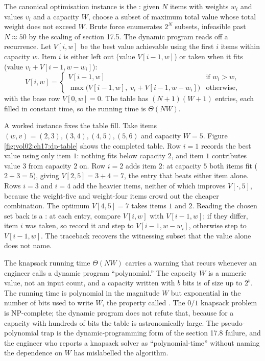 The canonical optimisation instance is the : given $N$ items with weights $w_{i}$ and values $v_{i}$
and a capacity $W$, choose a subset of maximum total value whose
total weight does not exceed $W$. Brute force enumerates $2^{N}$
subsets, infeasible past $N \approx 50$ by the scaling of section
17.5. The dynamic program reads off a recurrence. Let $V[i, w]$ be
the best value achievable using the first $i$ items within capacity
$w$. Item $i$ is either left out (value $V[i-1, w]$) or taken when
it fits (value $v_{i} + V[i-1, w - w_{i}]$):
\[
V[i, w] = \begin{cases}
  V[i-1, w] & \text{if } w_{i} > w, \\[2pt]
  \max\!\big(V[i-1, w],\; v_{i} + V[i-1, w - w_{i}]\big)
    & \text{otherwise,}
\end{cases}
\]
with the base row $V[0, w] = 0$. The table has $(N+1)(W+1)$ entries,
each filled in constant time, so the running time is $\Theta(N W)$.

A worked instance fixes the table fill. Take items $(w, v) = (2, 3),
(3, 4), (4, 5), (5, 6)$ and capacity $W = 5$. Figure
\ref{fig:vol02:ch17:dp-table} shows the completed table. Row $i = 1$
records the best value using only item $1$: nothing fits below
capacity $2$, and item $1$ contributes value $3$ from capacity $2$
on. Row $i = 2$ adds item $2$: at capacity $5$ both items fit
($2 + 3 = 5$), giving $V[2, 5] = 3 + 4 = 7$, the entry that beats
either item alone. Rows $i = 3$ and $i = 4$ add the heavier items,
neither of which improves $V[\cdot, 5]$, because the
weight-five and weight-four items crowd out the cheaper combination.
The optimum $V[4, 5] = 7$ takes items $1$ and $2$. Reading the
chosen set back is a : at each entry, compare
$V[i, w]$ with $V[i-1, w]$; if they differ, item $i$ was taken, so
record it and step to $V[i-1, w - w_{i}]$, otherwise step to
$V[i-1, w]$. The traceback recovers the witnessing subset that the
value alone does not name.



The knapsack running time $\Theta(N W)$ carries a warning that
recurs whenever an engineer calls a dynamic program ``polynomial.''
The capacity $W$ is a numeric value, not an input count, and a
capacity written with $b$ bits is of size up to $2^{b}$. The running
time is polynomial in the magnitude $W$ but exponential in the
number of bits used to write $W$, the property called
. The $0/1$ knapsack problem is
NP-complete; the dynamic program does not refute that, because for a
capacity with hundreds of bits the table is astronomically large.
The pseudo-polynomial trap is the dynamic-programming form of the
section 17.8 failure, and the engineer who reports a knapsack solver
as ``polynomial-time'' without naming the dependence on $W$ has
mislabelled the algorithm.


